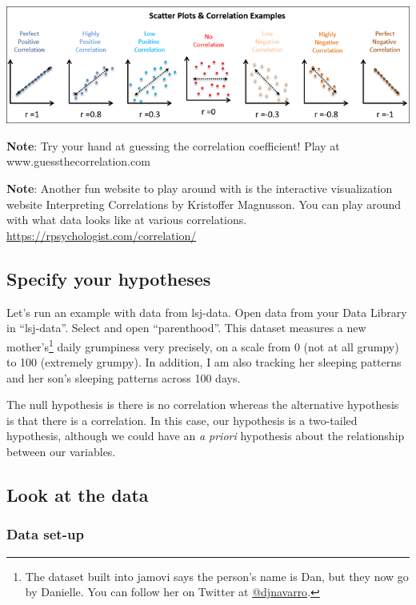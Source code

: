 \documentclass[
]{book}
\begin{document}
\includegraphics{images/08-correlation/correlation-examples.png}

\textbf{Note}: Try your hand at guessing the correlation coefficient! Play at www.guessthecorrelation.com

\textbf{Note}: Another fun website to play around with is the interactive visualization website Interpreting Correlations by Kristoffer Magnusson. You can play around with what data looks like at various correlations. \url{https://rpsychologist.com/correlation/}

\hypertarget{specify-your-hypotheses-6}{%
\subsection{Specify your hypotheses}\label{specify-your-hypotheses-6}}

Let's run an example with data from lsj-data. Open data from your Data Library in ``lsj-data''. Select and open ``parenthood''. This dataset measures a new mother's\footnote{The dataset built into jamovi says the person's name is Dan, but they now go by Danielle. You can follow her on Twitter at \href{https://twitter.com/djnavarro}{@djnavarro}.} daily grumpiness very precisely, on a scale from 0 (not at all grumpy) to 100 (extremely grumpy). In addition, I am also tracking her sleeping patterns and her son's sleeping patterns across 100 days.

The null hypothesis is there is no correlation whereas the alternative hypothesis is that there is a correlation. In this case, our hypothesis is a two-tailed hypothesis, although we could have an \emph{a priori} hypothesis about the relationship between our variables.

\hypertarget{look-at-the-data-8}{%
\subsection{Look at the data}\label{look-at-the-data-8}}

\hypertarget{data-set-up-8}{%
\subsubsection{Data set-up}\label{data-set-up-8}}
\end{document}
